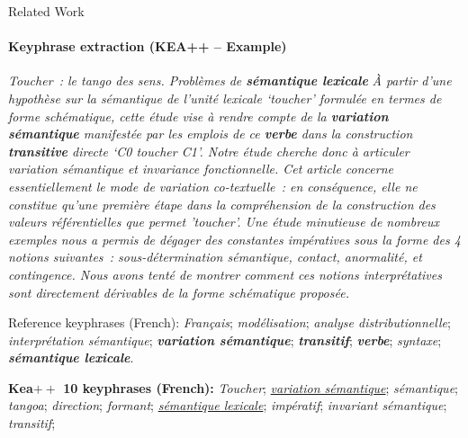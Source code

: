 \begin{frame}{Related Work}\framesubtitle{Keyphrase extraction (KEA++ -- Example)}
  \vfill{}
  \begin{exampleblock}{\normalsize
    \textit{Toucher~: le tango des sens. Problèmes de \textbf{sémantique lexicale}}
  }\justifying\footnotesize
    \textit{À partir d'une hypothèse sur la sémantique de l'unité lexicale `toucher' formulée en termes de forme schématique, cette étude vise à rendre compte de la \textbf{variation sémantique} manifestée par les emplois de ce \textbf{verbe} dans la construction \textbf{transitive} directe `C0 toucher C1'. Notre étude cherche donc à articuler variation sémantique et invariance fonctionnelle. Cet article concerne essentiellement le mode de variation co-textuelle~: en conséquence, elle ne constitue qu'une première étape dans la compréhension de la construction des valeurs référentielles que permet 'toucher'. Une étude minutieuse de nombreux exemples nous a permis de dégager des constantes impératives sous la forme des 4 notions suivantes~: sous-détermination sémantique, contact, anormalité, et contingence. Nous avons tenté de montrer comment ces notions interprétatives sont directement dérivables de la forme schématique proposée.}
  
    \begin{exampleblock}{\normalsize Reference keyphrases (French):}
      \textit{Français}; \textit{modélisation}; \textit{analyse distributionnelle}; \textit{interprétation sémantique}; \textbf{\textit{variation sémantique}}; \textbf{\textit{transitif}}; \textbf{\textit{verbe}}; \textit{syntaxe}; \textbf{\textit{sémantique lexicale}}.
    \end{exampleblock}
    
    \vspace{-.75em}
    
    \begin{exampleblock}{\normalsize \textbf{Kea$++$ 10 keyphrases (French):}}
      \textit{Toucher};
      \underline{\textit{variation sémantique}};
      \textit{sémantique};
      \textit{tangoa};
      \textit{direction};
      \textit{formant};
      \underline{\textit{sémantique lexicale}};
      \textit{impératif};
      \textit{invariant sémantique};
      \textit{transitif};
    \end{exampleblock}
  \end{exampleblock}
  \vfill{}
\end{frame}

